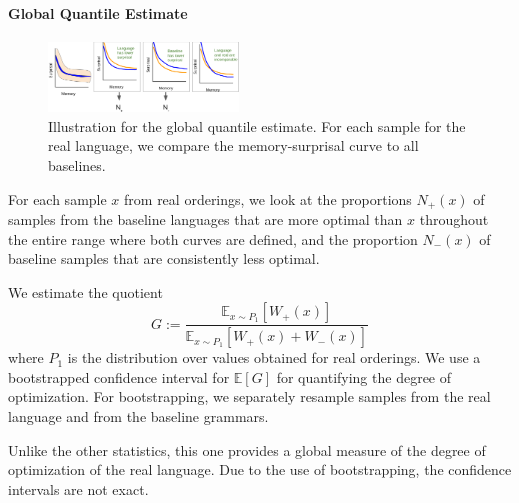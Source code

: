 \documentclass[11pt,letterpaper]{article}
\newcommand{\E}[0]{\mathbb{E}}
\begin{document}
\paragraph{Global Quantile Estimate}


\begin{figure}
	\begin{center}
\includegraphics[width=0.45\textwidth]{figures/quantile-global.png}
\end{center}
	\caption{Illustration for the global quantile estimate. For each sample for the real language, we compare the memory-surprisal curve to all baselines.}\label{fig:quantile-global}
\end{figure}



For each sample $x$ from real orderings, we look at the proportions $N_+(x)$ of samples from the baseline languages that are more optimal than $x$ throughout the entire range where both curves are defined, and the proportion $N_-(x)$ of baseline samples that are consistently less optimal.


We estimate the quotient
\begin{equation}\label{eq:g}
	G :=	\frac{\E_{x \sim P_1}[W_+(x)]}{\E_{x \sim P_1}[W_+(x) + W_-(x)]}
\end{equation}
where $P_1$ is the distribution over values obtained for real orderings.
We use a bootstrapped confidence interval for $\E[G]$ for quantifying the degree of optimization.
For bootstrapping, we separately resample samples from the real language and from the baseline grammars.

Unlike the other statistics, this one provides a global measure of the degree of optimization of the real language.
Due to the use of bootstrapping, the confidence intervals are not exact.


%
\end{document}
